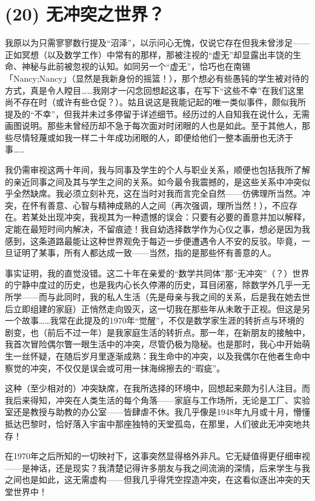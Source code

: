 \section{(20) 无冲突之世界？}

我原以为只需寥寥数行提及“沼泽”，以示问心无愧，仅说它存在但我未曾涉足——正如冥想（以及数学工作）中常有的那样，那被注视的“虚无”却显露出丰饶的生命、神秘与此前被忽视的认知。如同另一个“虚无”，恰巧也在南锡「Nancy;Nancy」（显然是我新身份的摇篮！），那个想必有些愚钝的学生被对待的方式，真是令人瞠目……我刚才一闪念回想起这事，在写下“这些不幸”在我们这里尚不存在时（或许有些仓促？）。姑且说这是我能记起的唯一类似事件，颇似我所提及的“不幸”，但我并未过多停留于详述细节。经历过的人自知我在说什么，无需画图说明。那些未曾经历却不急于每次面对时闭眼的人也是如此。至于其他人，那些尽情轻蔑或如我一样二十年成功闭眼的人，即便给他们一整本画册也无济于事……

我仍需审视这两十年间，我与同事及学生的个人与职业关系，顺便也包括我所了解的亲近同事之间及其与学生之间的关系。如今最令我震撼的，是这些关系中冲突似乎全然缺席。我必须立刻补充，这在当时对我而言完全自然——仿佛理所当然。冲突，在怀有善意、心智与精神成熟的人之间（再次强调，理所当然！），不应存在。若某处出现冲突，我视其为一种遗憾的误会：只要有必要的善意并加以解释，定能在最短时间内解决，不留痕迹！我自幼选择数学作为心仪之事，想必是因为我感到，这条道路最能让这种世界观免于每迈一步便遭遇令人不安的反驳。毕竟，一旦证明了某事，所有人都达成一致——当然，指的是那些怀有善意的人。

事实证明，我的直觉没错。这二十年在亲爱的“数学共同体”那“无冲突”（？）世界的宁静中度过的历史，也是我内心长久停滞的历史，耳目闭塞，除数学外几乎一无所学——而与此同时，我的私人生活（先是母亲与我之间的关系，后是我在她去世后立即组建的家庭）正悄然走向毁灭，这一切我在那些年从未敢于正视。但这是另一个故事……我常在此提及的1970年“觉醒”，不仅是数学家生涯的转折点与环境的剧变，也（前后不过一年）是我家庭生活的转折点。那一年，在新朋友的接触中，我首次冒险偶尔瞥一眼生活中的冲突，尽管仍极为隐秘。也是那时，我心中开始萌生一丝怀疑，在随后岁月里逐渐成熟：我生命中的冲突，以及我偶尔在他者生命中察觉的冲突，不仅仅是误会或可用一抹海绵擦去的“瑕疵”。

这种（至少相对的）冲突缺席，在我所选择的环境中，回想起来颇为引人注目。而我后来得知，冲突在人类生活的每个角落——家庭与工作场所，无论是工厂、实验室还是教授与助教的办公室——皆肆虐不休。我几乎像是1948年九月或十月，懵懂抵达巴黎时，恰好落入宇宙中那座独特的天堂孤岛，在那里，人们彼此无冲突地共存！

在1970年之后所知的一切映衬下，这事突然显得格外非凡。它无疑值得更仔细审视——是神话，还是现实？我清楚记得许多朋友与我之间流淌的深情，后来学生与我之间也是如此，这无需虚构——但我几乎得凭空捏造冲突，在这看似逐出冲突的天堂世界中！

